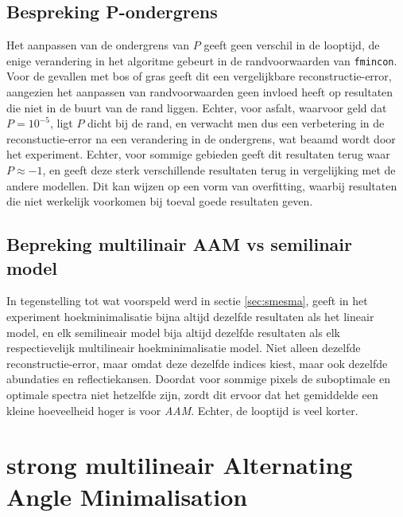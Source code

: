\documentclass[12pt]{report}
\begin{document}
\subsection{Bespreking P-ondergrens}

Het aanpassen van de ondergrens van $P$ geeft geen verschil in de looptijd, de enige verandering in het algoritme gebeurt in de randvoorwaarden van \texttt{fmincon}. Voor de gevallen met bos of gras geeft dit een vergelijkbare reconstructie-error, aangezien het aanpassen van randvoorwaarden geen invloed heeft op resultaten die niet in de buurt van de rand liggen. Echter, voor asfalt, waarvoor geld dat $P=10^{-5}$, ligt $P$ dicht bij de rand, en verwacht men dus een verbetering in de reconstuctie-error na een verandering in de ondergrens, wat beaamd wordt door het experiment. Echter, voor sommige gebieden geeft dit resultaten terug waar $P \approx -1$, en geeft deze sterk verschillende resultaten terug in vergelijking met de andere modellen. Dit kan wijzen op een vorm van overfitting, waarbij resultaten die niet werkelijk voorkomen bij toeval goede resultaten geven.

\subsection{Bepreking multilinair AAM vs semilinair model}

In tegenstelling tot wat voorspeld werd in sectie \ref{sec:smesma}, geeft in het experiment hoekminimalisatie bijna altijd dezelfde resultaten als het lineair model, en elk semilineair model bija altijd dezelfde resultaten als elk respectievelijk multilineair hoekminimalisatie model. Niet alleen dezelfde reconstructie-error, maar omdat deze dezelfde indices kiest, maar ook dezelfde abundaties en reflectiekansen. Doordat voor sommige pixels de suboptimale en optimale spectra niet hetzelfde zijn, zordt dit ervoor dat het gemiddelde een kleine hoeveelheid hoger is voor \textit{AAM}. Echter, de looptijd is veel korter. 

\section{strong multilineair Alternating Angle Minimalisation}
\end{document}

